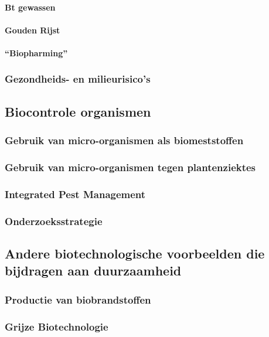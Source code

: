 \documentclass[a4paper,kul]{kulakarticle} %
\begin{document}
\paragraph{Bt gewassen}
\paragraph{Gouden Rijst}
\paragraph{“Biopharming”}
\subsubsection{Gezondheids- en milieurisico’s}
\subsection{Biocontrole organismen}
\subsubsection{Gebruik van micro-organismen als biomeststoffen}
\subsubsection{Gebruik van micro-organismen tegen plantenziektes}
\subsubsection{Integrated Pest Management}
\subsubsection{Onderzoeksstrategie}
\subsection{Andere biotechnologische voorbeelden die bijdragen aan duurzaamheid}
\subsubsection{Productie van biobrandstoffen}
\subsubsection{Grijze Biotechnologie}
\end{document}
